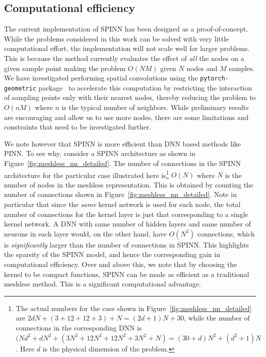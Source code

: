 \documentclass[12pt]{article}
\begin{document}
\subsection{Computational efficiency}
The current implementation of SPINN has been designed as a proof-of-concept.  While the problems considered in this work can be solved with very little computational effort, the implementation will not scale well for larger problems. This is because the method currently evaluates the effect of \emph{all} the nodes on a given sample point making the problem $O(NM)$ given $N$ nodes and $M$ samples.  We have investigated performing spatial convolutions using the \texttt{pytorch-geometric} package~\cite{pytorch_geometric} to accelerate this computation by restricting the interaction of sampling points only with their nearest nodes, thereby reducing the problem to $O(nM)$ where $n$ is the typical number of neighbors.  While preliminary results are encouraging and allow us to use more nodes, there are some limitations and constraints that need to be investigated further.

We note however that SPINN is more efficient than DNN based methods like PINN. To see why, consider a SPINN architecture as shown in Figure~\ref{fig:meshless_nn_detailed}. The number of connections in the SPINN architecture for the particular case illustrated here is\footnote{The actual numbers for the case shown in Figure~\ref{fig:meshless_nn_detailed} are $2dN + (3 + 12 + 12 + 3) + N = (2d + 1)N + 30$, while the number of connections in the corresponding DNN is $(Nd^2 + dN^2 + (3N^2 + 12N^2 + 12N^2 + 3N^2 + N) = (30 + d)N^2 + (d^2 + 1)N$. Here $d$ is the physical dimension of the problem.} $O(N)$ where $N$ is the number of nodes in the meshless representation. This is obtained by counting the number of connections shown in Figure~\ref{fig:meshless_nn_detailed}. Note in particular that since the \emph{same} kernel network is used for each node, the total number of connections for the kernel layer is just that corresponding to a single kernel network. A DNN with same number of hidden layers and same number of neurons in each layer would, on the other hand, have $O(N^2)$ connections, which is \emph{significantly} larger than the number of connections in SPINN. This highlights the sparsity of the SPINN model, and hence the corresponding gain in computational efficiency. Over and above this, we note that by choosing the kernel to be compact functions, SPINN can be made as efficient as a traditional meshless method. This is a significant computational advantage.
\end{document}
